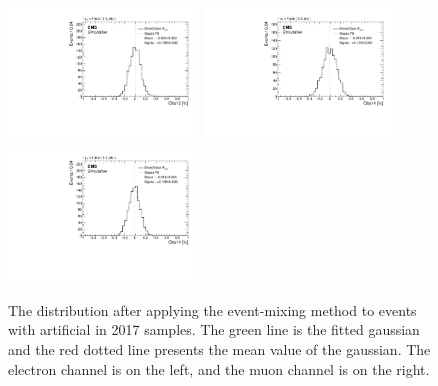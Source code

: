 \begin{figure}
    \includegraphics[width=0.45\textwidth]{figure/SimAcp_17_mu_Obs12_Acp_10_mixed.pdf}
    \includegraphics[width=0.45\textwidth]{figure/SimAcp_17_el_Obs14_Acp_10_mixed.pdf}
    \includegraphics[width=0.45\textwidth]{figure/SimAcp_17_mu_Obs14_Acp_10_mixed.pdf}
    \caption[The \Acpprime distribution after applying the event-mixing method to \ttbar events in 2017 samples.]
    {
        The \Acpprime distribution after applying the event-mixing method to \ttbar events with artificial \Acpprime in 2017 samples. 
        The green line is the fitted gaussian and the red dotted line presents the mean value of the gaussian.
        The electron channel is on the left, and the muon channel is on the right.
    }
    \label{fig:17_exchanging_simulation_acp}
\end{figure}
